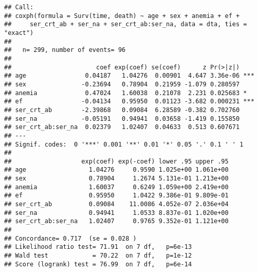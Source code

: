 \documentclass[
]{article}
\newenvironment{Shaded}{\begin{snugshade}}{\end{snugshade}}
\newcommand{\AttributeTok}[1]{\textcolor[rgb]{0.77,0.63,0.00}{#1}}
\newcommand{\DecValTok}[1]{\textcolor[rgb]{0.00,0.00,0.81}{#1}}
\newcommand{\FunctionTok}[1]{\textcolor[rgb]{0.00,0.00,0.00}{#1}}
\newcommand{\NormalTok}[1]{#1}
\newcommand{\OtherTok}[1]{\textcolor[rgb]{0.56,0.35,0.01}{#1}}
\newcommand{\SpecialCharTok}[1]{\textcolor[rgb]{0.00,0.00,0.00}{#1}}
\newcommand{\StringTok}[1]{\textcolor[rgb]{0.31,0.60,0.02}{#1}}
\begin{document}
\begin{verbatim}
## Call:
## coxph(formula = Surv(time, death) ~ age + sex + anemia + ef + 
##     ser_crt_ab + ser_na + ser_crt_ab:ser_na, data = dta, ties = "exact")
## 
##   n= 299, number of events= 96 
## 
##                       coef exp(coef) se(coef)      z Pr(>|z|)    
## age                0.04187   1.04276  0.00901  4.647 3.36e-06 ***
## sex               -0.23694   0.78904  0.21959 -1.079 0.280597    
## anemia             0.47024   1.60038  0.21078  2.231 0.025683 *  
## ef                -0.04134   0.95950  0.01123 -3.682 0.000231 ***
## ser_crt_ab        -2.39868   0.09084  6.28589 -0.382 0.702760    
## ser_na            -0.05191   0.94941  0.03658 -1.419 0.155850    
## ser_crt_ab:ser_na  0.02379   1.02407  0.04633  0.513 0.607671    
## ---
## Signif. codes:  0 '***' 0.001 '**' 0.01 '*' 0.05 '.' 0.1 ' ' 1
## 
##                   exp(coef) exp(-coef) lower .95 upper .95
## age                 1.04276     0.9590 1.025e+00 1.061e+00
## sex                 0.78904     1.2674 5.131e-01 1.213e+00
## anemia              1.60037     0.6249 1.059e+00 2.419e+00
## ef                  0.95950     1.0422 9.386e-01 9.809e-01
## ser_crt_ab          0.09084    11.0086 4.052e-07 2.036e+04
## ser_na              0.94941     1.0533 8.837e-01 1.020e+00
## ser_crt_ab:ser_na   1.02407     0.9765 9.352e-01 1.121e+00
## 
## Concordance= 0.717  (se = 0.028 )
## Likelihood ratio test= 71.91  on 7 df,   p=6e-13
## Wald test            = 70.22  on 7 df,   p=1e-12
## Score (logrank) test = 76.99  on 7 df,   p=6e-14
\end{verbatim}

\begin{Shaded}
\end{Shaded}
\end{document}
